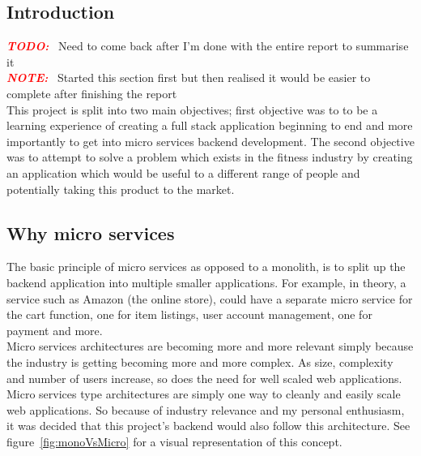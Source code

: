 \documentclass{article}
\newcommand{\vspaceconst}{-2ex}
\newcommand{\TODO}{\textbf{\textit{\textcolor{red}{TODO:}}} }
\newcommand{\NOTE}{\textbf{\textit{\textcolor{red}{NOTE:}}} }
\begin{document}
\begin{multicols}{2}
\section{Introduction}
\vspace{\vspaceconst}

\TODO~Need to come back after I'm done with the entire report to summarise it\\
\NOTE~Started this section first but then realised it would be easier to complete after finishing the report\\

This project is split into two main objectives; first objective was to to be a learning experience of creating a full stack application beginning to end and more importantly to get into micro services backend development. The second objective was to attempt to solve a problem which exists in the fitness industry by creating an application which would be useful to a different range of people and potentially taking this product to the market.\\

\subsection{Why micro services}
\vspace{\vspaceconst}

  The basic principle of micro services as opposed to a monolith, is to split up the backend application into multiple smaller applications. For example, in theory, a service such as Amazon (the online store), could have a separate micro service for the cart function, one for item listings, user account management, one for payment and more.\\
  Micro services architectures are becoming more and more relevant simply because the industry is getting becoming more and more complex. As size, complexity and number of users increase, so does the need for well scaled web applications. Micro services type architectures are simply one way to cleanly and easily scale web applications. So because of industry relevance and my personal enthusiasm, it was decided that this project's backend would also follow this architecture. See figure~\ref{fig:monoVsMicro} for a visual representation of this concept.\\


\end{multicols}
\end{document}
